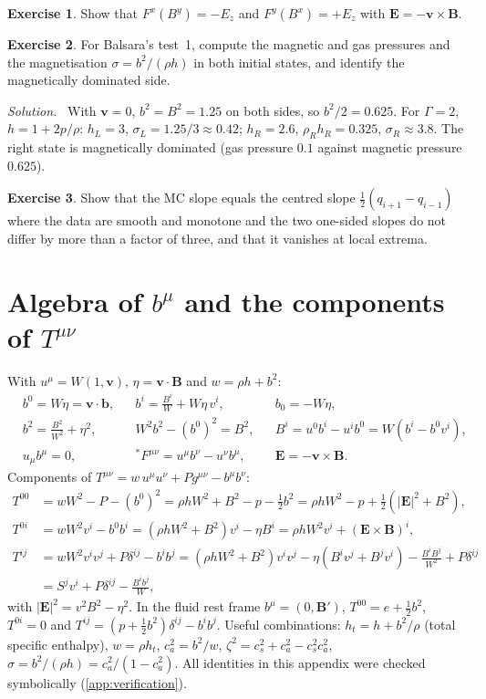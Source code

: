 \documentclass[11pt,a4paper,oneside,openany]{book}
\theoremstyle{definition}
\newtheorem{exercise}{Exercise}[chapter]
\theoremstyle{plain}
\theoremstyle{remark}
\newenvironment{solution}{\par\smallskip\noindent\small\textit{Solution.}\ }{\par\medskip}
\newcommand{\vv}{\bm{v}}
\newcommand{\BB}{\bm{B}}
\newcommand{\EE}{\bm{E}}
\newcommand{\Ptot}{P}
\newcommand{\vB}{\eta}
\begin{document}
\begin{exercise}
Show that $F^x(B^y)=-E_z$ and $F^y(B^x)=+E_z$ with $\EE=-\vv\times\BB$.
\end{exercise}

\begin{exercise}
For Balsara's test~1, compute the magnetic and gas pressures and the magnetisation
$\sigma=b^2/(\rho h)$ in both initial states, and identify the magnetically dominated side.
\end{exercise}
\begin{solution}
With $\vv=0$, $b^2=B^2=1.25$ on both sides, so $b^2/2=0.625$. For $\Gamma=2$,
$h=1+2p/\rho$: $h_L=3$, $\sigma_L=1.25/3\approx0.42$; $h_R=2.6$, $\rho_Rh_R=0.325$,
$\sigma_R\approx3.8$. The right state is magnetically dominated (gas pressure $0.1$ against
magnetic pressure $0.625$).
\end{solution}

\begin{exercise}
Show that the MC slope equals the centred slope $\frac12(q_{i+1}-q_{i-1})$ where the data are
smooth and monotone and the two one-sided slopes do not differ by more than a factor of
three, and that it vanishes at local extrema.
\end{exercise}


\appendix

\chapter{Algebra of \texorpdfstring{$b^\mu$}{b} and the components of \texorpdfstring{$T^{\mu\nu}$}{T}}\label{app:bmu}

With $u^\mu=W(1,\vv)$, $\vB=\vv\cdot\BB$ and $w=\rho h+b^2$:
\begin{align*}
&b^0=W\vB=\vv\cdot\bm b, &&b^i=\frac{B^i}{W}+W\vB\,v^i, &&b_0=-W\vB,\\
&b^2=\frac{B^2}{W^2}+\vB^2, &&W^2b^2-(b^0)^2=B^2, &&B^i=u^0b^i-u^ib^0=W(b^i-b^0v^i),\\
&u_\mu b^\mu=0, &&{}^\ast\!F^{\mu\nu}=u^\mu b^\nu-u^\nu b^\mu, &&\EE=-\vv\times\BB .
\end{align*}
Components of $T^{\mu\nu}=w\,u^\mu u^\nu+\Ptot g^{\mu\nu}-b^\mu b^\nu$:
\begin{align*}
T^{00}&=wW^2-\Ptot-(b^0)^2=\rho hW^2+B^2-p-\tfrac12b^2=\rho hW^2-p+\tfrac12(|\EE|^2+B^2),\\
T^{0i}&=wW^2v^i-b^0b^i=(\rho hW^2+B^2)v^i-\vB B^i=\rho hW^2v^i+(\EE\times\BB)^i,\\
T^{ij}&=wW^2v^iv^j+\Ptot\delta^{ij}-b^ib^j
=(\rho hW^2+B^2)v^iv^j-\vB(B^iv^j+B^jv^i)-\frac{B^iB^j}{W^2}+\Ptot\delta^{ij}\\
&=S^jv^i+\Ptot\delta^{ij}-\frac{B^ib^j}{W},
\end{align*}
with $|\EE|^2=v^2B^2-\vB^2$. In the fluid rest frame $b^\mu=(0,\BB')$, $T^{00}=e+\frac12b^2$,
$T^{0i}=0$ and $T^{ij}=(p+\frac12b^2)\delta^{ij}-b^ib^j$. Useful combinations:
$h_t=h+b^2/\rho$ (total specific enthalpy), $w=\rho h_t$, $c_a^2=b^2/w$,
$\zeta^2=c_s^2+c_a^2-c_s^2c_a^2$, $\sigma=b^2/(\rho h)=c_a^2/(1-c_a^2)$. All identities in
this appendix were checked symbolically (\cref{app:verification}).
\end{document}
